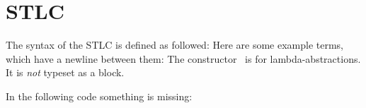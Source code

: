 \documentclass{article}
\begin{document}
  \section{STLC}
  The syntax of the STLC is defined as followed:
  \STLCSyntax
  Here are some example terms, which have a newline between them:
  \STLCExamples
  The constructor \STLCEAbs\ is for lambda-abstractions. It is \emph{not} typeset as a block.

  In the following code something is missing:
  \STLCHideExample
\end{document}

